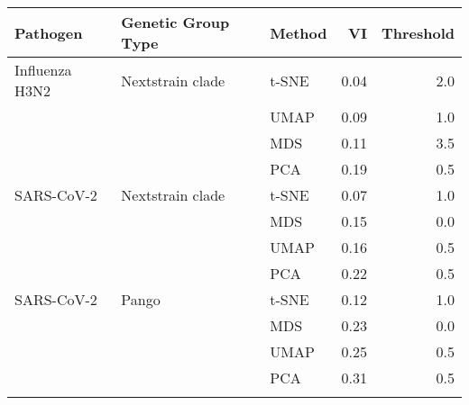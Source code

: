 \begin{tabular}{lllrr}
\toprule
      Pathogen & Genetic Group Type & Method &   VI &  Threshold \\
\midrule
Influenza H3N2 &   Nextstrain clade &  t-SNE & 0.04 &        2.0 \\
               &                    &   UMAP & 0.09 &        1.0 \\
               &                    &    MDS & 0.11 &        3.5 \\
               &                    &    PCA & 0.19 &        0.5 \\
    SARS-CoV-2 &   Nextstrain clade &  t-SNE & 0.07 &        1.0 \\
               &                    &    MDS & 0.15 &        0.0 \\
               &                    &   UMAP & 0.16 &        0.5 \\
               &                    &    PCA & 0.22 &        0.5 \\
    SARS-CoV-2 &              Pango &  t-SNE & 0.12 &        1.0 \\
               &                    &    MDS & 0.23 &        0.0 \\
               &                    &   UMAP & 0.25 &        0.5 \\
               &                    &    PCA & 0.31 &        0.5 \\
\botrule
\end{tabular}
